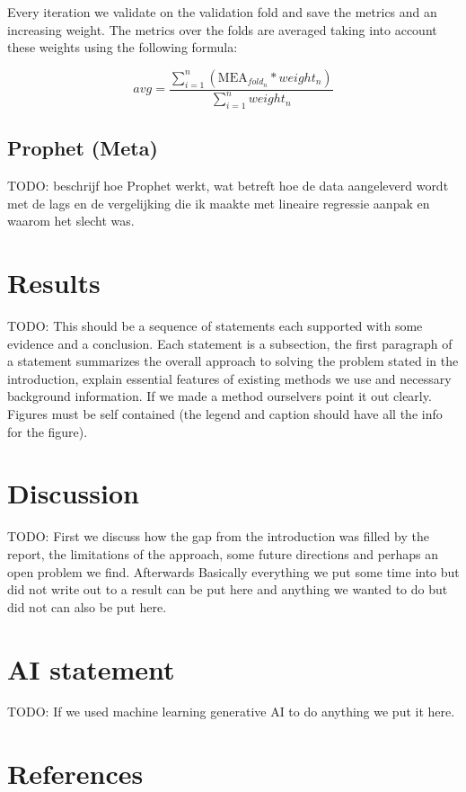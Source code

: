 \documentclass[conference]{IEEEtran}
\begin{document}
Every iteration we validate on the validation fold and save the metrics and an increasing weight. 
The metrics over the folds are averaged taking into account these weights using the following
formula:

$$avg = \frac{\sum_{i=1}^{n}(\text{MEA}_{fold_n} * weight_n)}{\sum_{i=1}^n weight_n}$$

\subsection{Prophet (Meta)}
TODO: beschrijf hoe Prophet werkt, wat betreft hoe de data aangeleverd wordt met de lags en de 
vergelijking die ik maakte met lineaire regressie aanpak en waarom het slecht was.

\section{Results}
TODO: This should be a sequence of statements each supported with some evidence and a conclusion.
Each statement is a subsection, the first paragraph of a statement summarizes the overall approach 
to solving the problem stated in the introduction, explain essential features of existing methods
we use and necessary background information. If we made a method ourselvers point it out clearly. 
Figures must be self contained (the legend and caption should have all the info for the figure).

\section{Discussion}
TODO: First we discuss how the gap from the introduction was filled by the report, the limitations
of the approach, some future directions and perhaps an open problem we find. Afterwards Basically 
everything we put some time into but did not write out to a result can be put here and anything we 
wanted to do but did not can also be put here.

\section*{AI statement}
TODO: If we used machine learning generative AI to do anything we put it here.

\section*{References}
\end{document}
